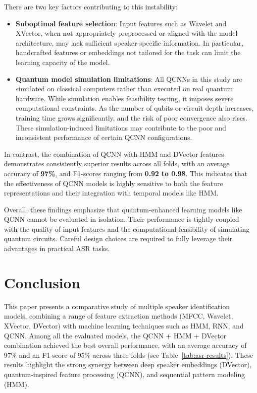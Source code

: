 \documentclass[conference]{IEEEtran}
\begin{document}
There are two key factors contributing to this instability:

\begin{itemize}
    \item \textbf{Suboptimal feature selection}: Input features such as Wavelet and XVector, when not appropriately preprocessed or aligned with the model architecture, may lack sufficient speaker-specific information. In particular, handcrafted features or embeddings not tailored for the task can limit the learning capacity of the model.
    
    \item \textbf{Quantum model simulation limitations}: All QCNNs in this study are simulated on classical computers rather than executed on real quantum hardware. While simulation enables feasibility testing, it imposes severe computational constraints. As the number of qubits or circuit depth increases, training time grows significantly, and the risk of poor convergence also rises. These simulation-induced limitations may contribute to the poor and inconsistent performance of certain QCNN configurations.
\end{itemize}

In contrast, the combination of QCNN with HMM and DVector features demonstrates consistently superior results across all folds, with an average accuracy of \textbf{97\%}, and F1-scores ranging from \textbf{0.92 to 0.98}. This indicates that the effectiveness of QCNN models is highly sensitive to both the feature representations and their integration with temporal models like HMM.

Overall, these findings emphasize that quantum-enhanced learning models like QCNN cannot be evaluated in isolation. Their performance is tightly coupled with the quality of input features and the computational feasibility of simulating quantum circuits. Careful design choices are required to fully leverage their advantages in practical ASR tasks.

\section{Conclusion}

This paper presents a comparative study of multiple speaker identification models, combining a range of feature extraction methods (MFCC, Wavelet, XVector, DVector) with machine learning techniques such as HMM, RNN, and QCNN. Among all the evaluated models, the QCNN + HMM + DVector combination achieved the best overall performance, with an average accuracy of 97\% and an F1-score of 95\% across three folds (see Table~\ref{tab:asr-results}). These results highlight the strong synergy between deep speaker embeddings (DVector), quantum-inspired feature processing (QCNN), and sequential pattern modeling (HMM).
\end{document}
